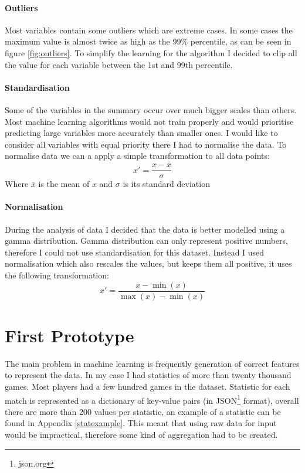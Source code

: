 \documentclass[12pt,a4paper]{book}
\newcommand\mean[1]{\overline{#1}}
\begin{document}
\paragraph{Outliers}
Most variables contain some outliers which are extreme cases.
In some cases the maximum value is almost twice as high as the 99\% percentile, as can be seen in figure \ref{fig:outliers}.
To simplify the learning for the algorithm I decided to clip all the value for each variable between the 1st and 99th percentile.
\paragraph{Standardisation}
Some of the variables in the summary occur over much bigger scales than others.
Most machine learning algorithms would not train properly and would prioritise predicting large variables more accurately than smaller ones.
I would like to consider all variables with equal priority there I had to normalise the data.
To normalise data we can a apply a simple transformation to all data points:
\begin{equation}
x' = \frac{x - \mean{x}}{\sigma}
\end{equation}
Where $\mean{x}$ is the mean of $x$ and $\sigma$ is its standard deviation
\paragraph{Normalisation}
During the analysis of data I decided that the data is better modelled using a gamma distribution.
Gamma distribution can only represent positive numbers, therefore I could not use standardisation for this dataset.
Instead I used normalisation which also rescales the values, but keeps them all positive, it uses the following transformation:
\begin{equation}
x' = \frac{x - \min(x)}{\max(x)-\min(x)}
\end{equation}
\section{First Prototype}
The main problem in machine learning is frequently generation of correct features to represent the data.
In my case I had statistics of more than twenty thousand games.
Most players had a few hundred games in the dataset.
Statistic for each match is represented as a dictionary of key-value pairs (in JSON\footnote{json.org} format), overall there are more than 200 values per statistic, an example of a statistic can be found in Appendix \ref{statexample}.
This meant that using raw data for input would be impractical, therefore some kind of aggregation had to be created.
\end{document}
